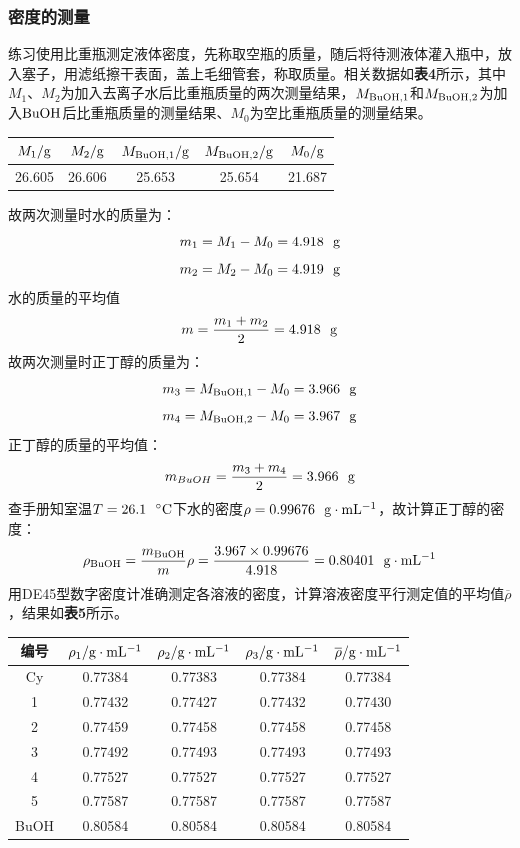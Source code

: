 \documentclass[12pt]{article}
\begin{document}
	 		\subsubsection{密度的测量}
			练习使用比重瓶测定液体密度，先称取空瓶的质量，随后将待测液体灌入瓶中，放入塞子，用滤纸擦干表面，盖上毛细管套，称取质量。相关数据如\textbf{表4}所示，其中$M_{1}$、$M_{2}$为加入去离子水后比重瓶质量的两次测量结果，$M_{\rm BuOH,1}$和$M_{\rm BuOH,2}$为加入$\rm BuOH$后比重瓶质量的测量结果、$M_{0}$为空比重瓶质量的测量结果。\par
			\begin{table}[h]
				\centering
				\begin{tabular}{ccccc}
					\toprule
					$M_{1}/{\rm g}$ & $M_{2}/{\rm g}$ & $M_{\rm BuOH,1}/{\rm g}$ & $M_{\rm BuOH,2}/{\rm g}$ & $M_{0}/{\rm g}$ \\
					\midrule
					26.605 & 26.606 & 25.653 & 25.654 & 21.687 \\
					\bottomrule
				\end{tabular}
			\end{table}
			故两次测量时水的质量为：
			$$m_{1}=M_{1}-M_{0}=4.918\ \ {\rm g}$$
			$$m_{2}=M_{2}-M_{0}=4.919\ \ {\rm g}$$
			水的质量的平均值$$m=\frac{m_{1}+m_{2}}{2}=4.918\ \ {\rm g}$$
			故两次测量时正丁醇的质量为：
			$$m_{3}=M_{\rm BuOH,1}-M_{0}=3.966\ \ {\rm g}$$
			$$m_{4}=M_{\rm BuOH,2}-M_{0}=3.967\ \ {\rm g}$$
			正丁醇的质量的平均值：$$m_{BuOH}=\frac{m_{3}+m_{4}}{2}=3.966\ \ {\rm g}$$
			查手册知室温\citealp{dean1992lange}$T=26.1\ \ {\rm ^{\circ}C}$下水的密度$\rho=0.99676\ \ {\rm g\cdot mL^{-1}}$，故计算正丁醇的密度：
			$$
			\rho_{\rm BuOH}=\frac{m_{\rm BuOH}}{m}\rho=\frac{3.967\times 0.99676}{4.918}=0.80401\ \ {\rm g\cdot mL^{-1}}
			$$
			\vbox{} %
			用DE45型数字密度计准确测定各溶液的密度，计算溶液密度平行测定值的平均值$\overline{\rho}$，结果如\textbf{表5}所示。
			\begin{table}[h]
				\centering
				\begin{tabular}{ccccc}
					\toprule
					编号 & $\rho_{1}/{\rm g\cdot mL^{-1}}$ & $\rho_{2}/{\rm g\cdot mL^{-1}}$ & $\rho_{3}/{\rm g\cdot mL^{-1}}$ & $\overline{\rho}/{\rm g\cdot mL^{-1}}$ \\
					\midrule
					Cy   & 0.77384 & 0.77383 & 0.77384 & 0.77384 \\
					1    & 0.77432 & 0.77427 & 0.77432 & 0.77430 \\
					2    & 0.77459 & 0.77458 & 0.77458 & 0.77458 \\
					3    & 0.77492 & 0.77493 & 0.77493 & 0.77493 \\
					4    & 0.77527 & 0.77527 & 0.77527 & 0.77527 \\
					5    & 0.77587 & 0.77587 & 0.77587 & 0.77587 \\
					BuOH & 0.80584 & 0.80584 & 0.80584 & 0.80584 \\
					\bottomrule
				\end{tabular}
			\end{table}
\end{document}
